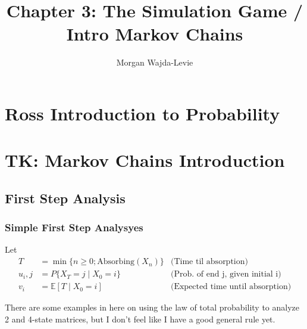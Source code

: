 \documentclass{article}
\title{Chapter 3: The Simulation Game / Intro Markov Chains}
\author{Morgan Wajda-Levie}
\newcommand\Prob[1]{P\{#1\}}
\begin{document}
\setcounter{section}{3}
\section{Ross Introduction to Probability}
\subsection{}
\subsection{}
\subsection{}

\setcounter{section}{2}
\section{TK: Markov Chains Introduction}
\subsection{}
\subsection{}
\subsection{}
\subsection{First Step Analysis}
\subsubsection{Simple First Step Analysyes}

Let
\begin{align*}
    T &= \min\{n \ge 0; \text{Absorbing}(X_n)\}
      & \text{(Time til absorption)}\\
    u_i,j &= \Prob{X_T = j \mid X_0 = i}
          & \text{(Prob. of end j, given initial i)}\\
    v_i &= \mathbb E[T \mid X_0 = i]
        & \text{(Expected time until absorption)}
\end{align*}

There are some examples in here on using the law of total probability to
analyze 2 and 4-state matrices, but I don't feel like I have a good
general rule yet.
\end{document}
